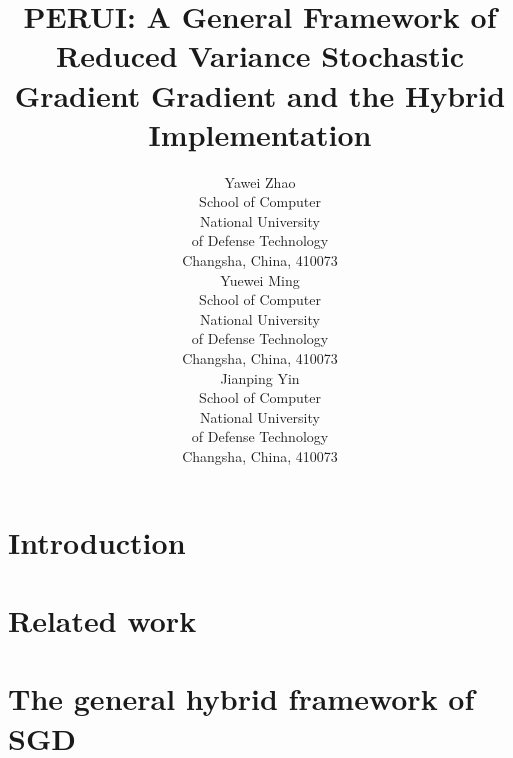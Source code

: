 \documentclass[letterpaper]{article}
\begin{document}
%
\title{PERUI: A General Framework of Reduced Variance Stochastic Gradient Gradient and the Hybrid Implementation}
\author{Yawei Zhao\\
School of Computer\\
National University\\
of Defense Technology\\
Changsha, China, 410073\\
\And
Yuewei Ming\\
School of Computer\\
National University\\
of Defense Technology\\
Changsha, China, 410073\\
\And
Jianping Yin\\
School of Computer\\
National University\\
of Defense Technology\\
Changsha, China, 410073\\
}
\maketitle
\begin{abstract}

\end{abstract}

\section{Introduction}
\label{sect_introduction}



\section{Related work}
\label{sect_related_work}




\section{The general hybrid framework of SGD}
\label{sect_framework}
\end{document}
